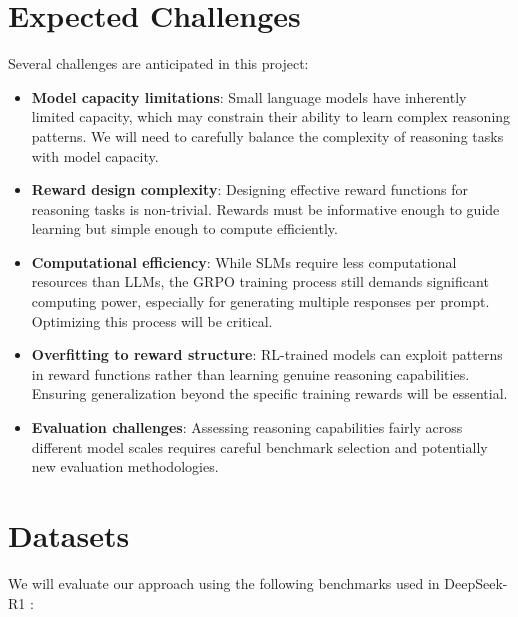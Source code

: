 \documentclass[11pt, oneside]{article}   	%
\begin{document}
\section*{Expected Challenges}

Several challenges are anticipated in this project:

\begin{itemize}
	\item \textbf{Model capacity limitations}: Small language models have inherently limited capacity, which may constrain their ability to learn complex reasoning patterns. We will need to carefully balance the complexity of reasoning tasks with model capacity.

	\item \textbf{Reward design complexity}: Designing effective reward functions for reasoning tasks is non-trivial. Rewards must be informative enough to guide learning but simple enough to compute efficiently.

	\item \textbf{Computational efficiency}: While SLMs require less computational resources than LLMs, the GRPO training process still demands significant computing power, especially for generating multiple responses per prompt. Optimizing this process will be critical.

	\item \textbf{Overfitting to reward structure}: RL-trained models can exploit patterns in reward functions rather than learning genuine reasoning capabilities. Ensuring generalization beyond the specific training rewards will be essential.

	\item \textbf{Evaluation challenges}: Assessing reasoning capabilities fairly across different model scales requires careful benchmark selection and potentially new evaluation methodologies.
\end{itemize}

\section*{Datasets}


We will evaluate our approach using the following benchmarks used in DeepSeek-R1 \cite{deepseekai2025deepseekr1incentivizingreasoningcapability}:
\end{document}
